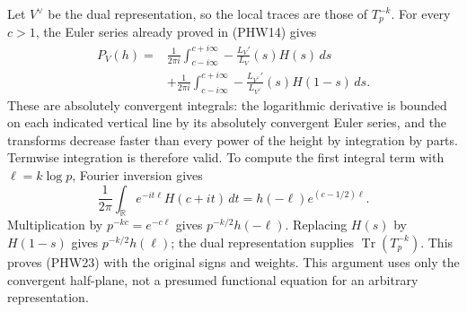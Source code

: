 \documentclass[
  10pt,
  a4paper,
]{article}
\begin{document}
Let \(V^\vee\) be the dual representation, so the local traces are those
of \(T_p^{-k}\). For every \(c>1\), the Euler series already proved in
(PHW14) gives \[
\begin{aligned}
P_V(h)={}&\frac1{2\pi i}\int_{c-i\infty}^{c+i\infty}
-\frac{L_V'}{L_V}(s)H(s)\,ds\\
&+\frac1{2\pi i}\int_{c-i\infty}^{c+i\infty}
-\frac{L_{V^\vee}'}{L_{V^\vee}}(s)H(1-s)\,ds.
\end{aligned}
\tag{PHW23}
\] These are absolutely convergent integrals: the logarithmic derivative
is bounded on each indicated vertical line by its absolutely convergent
Euler series, and the transforms decrease faster than every power of the
height by integration by parts. Termwise integration is therefore valid.
To compute the first integral term with \(\ell=k\log p\), Fourier
inversion gives \[
\frac1{2\pi}\int_{\mathbb R}e^{-it\ell}H(c+it)\,dt
=h(-\ell)e^{(c-1/2)\ell}.
\] Multiplication by \(p^{-kc}=e^{-c\ell}\) gives \(p^{-k/2}h(-\ell)\).
Replacing \(H(s)\) by \(H(1-s)\) gives \(p^{-k/2}h(\ell)\); the dual
representation supplies \(\operatorname{Tr}(T_p^{-k})\). This proves
(PHW23) with the original signs and weights. This argument uses only the
convergent half-plane, not a presumed functional equation for an
arbitrary representation.
\end{document}
